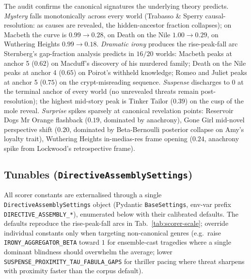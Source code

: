 \documentclass[11pt]{article}
\begin{document}
The audit confirms the canonical signatures the underlying
theory predicts. \emph{Mystery} falls monotonically across every
world (Trabasso \& Sperry causal-resolution: as causes are
revealed, the hidden-ancestor fraction collapses); on Macbeth
the curve is $0.99 \to 0.28$, on Death on the Nile $1.00 \to
0.29$, on Wuthering Heights $0.99 \to 0.18$. \emph{Dramatic
irony} produces the rise-peak-fall arc Sternberg's gap-fraction
analysis predicts in $16/20$ worlds: Macbeth peaks at anchor 5
($0.62$) on Macduff's discovery of his murdered family; Death on
the Nile peaks at anchor 4 ($0.65$) on Poirot's withheld
knowledge; Romeo and Juliet peaks at anchor 5 ($0.75$) on the
crypt-misreading sequence. \emph{Suspense} discharges to $0$ at
the terminal anchor of every world (no unrevealed threats remain
post-resolution); the highest mid-story peak is Tinker Tailor
($0.39$) on the cusp of the mole reveal. \emph{Surprise} spikes
sparsely at canonical revelation points: Reservoir Dogs Mr Orange
flashback ($0.19$, dominated by anachrony), Gone Girl mid-novel
perspective shift ($0.20$, dominated by Beta-Bernoulli posterior
collapse on Amy's loyalty trait), Wuthering Heights in-medias-res
frame opening ($0.24$, anachrony spike from Lockwood's
retrospective frame).

\subsection{Tunables (\texttt{DirectiveAssemblySettings})}
\label{app:scorer-tunables}

All scorer constants are externalised through a single
\texttt{DirectiveAssemblySettings} object (Pydantic
\texttt{BaseSettings}, env-var prefix
\texttt{DIRECTIVE\_ASSEMBLY\_*}), enumerated below with their
calibrated defaults. The defaults reproduce the rise-peak-fall
arcs in Tab.~\ref{tab:scorer-scale}; override individual
constants only when targeting non-canonical genres (e.g.\ raise
\texttt{IRONY\_AGGREGATOR\_BETA} toward $1$ for ensemble-cast
tragedies where a single dominant blindness should overwhelm the
average; lower \texttt{SUSPENSE\_PROXIMITY\_TAU\_FABULA\_GAPS}
for thriller pacing where threat sharpens with proximity faster
than the corpus default).
\end{document}

